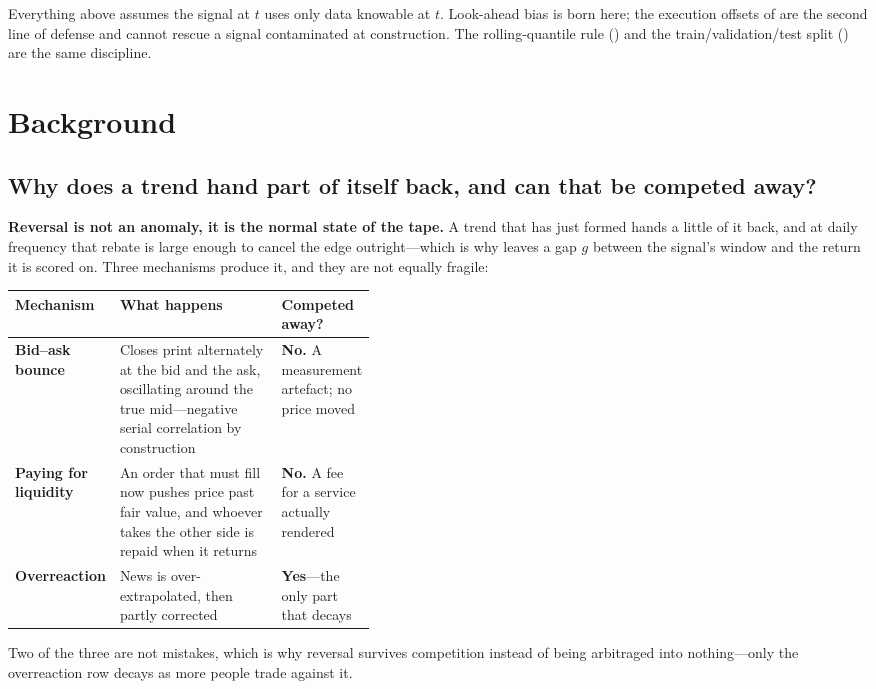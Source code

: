 Everything above assumes the signal at $t$ uses only data knowable at $t$. Look-ahead bias is born
here; the execution offsets of  are the second line of
defense and cannot rescue a signal contaminated at construction. The rolling-quantile rule
() and the train/validation/test split
() are the same discipline.


\section*{Background}

\subsection*{Why does a trend hand part of itself back, and can that be competed away?}

\textbf{Reversal is not an anomaly, it is the normal state of the tape.} A trend that has just
formed hands a little of it back, and at daily frequency that rebate is large enough to cancel the
edge outright---which is why  leaves a gap $g$ between the signal's window
and the return it is scored on. Three mechanisms produce it, and they are not equally fragile:

\begin{tabularx}{\linewidth}{|>{\raggedright\arraybackslash}p{0.20\linewidth}|X|>{\raggedright\arraybackslash}p{0.22\linewidth}|}
\hline
\textbf{Mechanism} & \textbf{What happens} & \textbf{Competed away?} \\ \hline
\textbf{Bid--ask bounce}
  & Closes print alternately at the bid and the ask, oscillating around the true mid---negative
    serial correlation by construction
  & \textbf{No.} A measurement artefact; no price moved \\ \hline
\textbf{Paying for liquidity}
  & An order that must fill now pushes price past fair value, and whoever takes the other side is
    repaid when it returns
  & \textbf{No.} A fee for a service actually rendered \\ \hline
\textbf{Overreaction}
  & News is over-extrapolated, then partly corrected
  & \textbf{Yes}---the only part that decays \\ \hline
\end{tabularx}

Two of the three are not mistakes, which is why reversal survives competition instead of being
arbitraged into nothing---only the overreaction row decays as more people trade against it.


